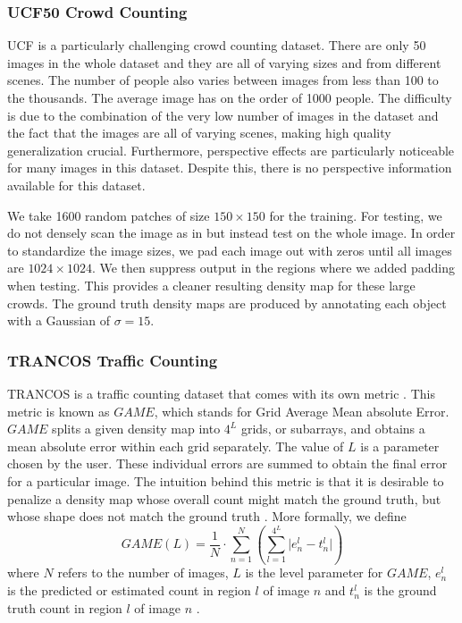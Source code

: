 \documentclass[10pt,twocolumn,letterpaper]{article}
\begin{document}
\subsubsection{UCF50 Crowd Counting}

UCF is a particularly challenging crowd counting dataset. There are only 50 images in the whole dataset and they are all of varying sizes and from different scenes. The number of people also varies between images from less than 100 to the thousands. The average image has on the order of 1000 people. The difficulty is due to the combination of the very low number of images in the dataset and the fact that the images are all of varying scenes, making high quality generalization crucial. Furthermore, perspective effects are particularly noticeable for many images in this dataset. Despite this, there is no perspective information available for this dataset.

We take 1600 random patches of size \(150 \times 150\) for the training. For testing, we do not densely scan the image as in \cite{rubio2016} but instead test on the whole image. In order to standardize the image sizes, we pad each image out with zeros until all images are \(1024 \times 1024\). We then suppress output in the regions where we added padding when testing. This provides a cleaner resulting density map for these large crowds. The ground truth density maps are produced by annotating each object with a Gaussian of \(\sigma = 15\).

\subsubsection{TRANCOS Traffic Counting}\label{trancos_explanation}

TRANCOS is a traffic counting dataset that comes with its own metric \cite{TRANCOSdataset_IbPRIA2015}. This metric is known as \(GAME\), which stands for Grid Average Mean absolute Error. \(GAME\) splits a given density map into \(4^L\) grids, or subarrays, and obtains a mean absolute error within each grid separately. The value of \(L\) is a parameter chosen by the user. These individual errors are summed to obtain the final error for a particular image. The intuition behind this metric is that it is desirable to penalize a density map whose overall count might match the ground truth, but whose shape does not match the ground truth \cite{TRANCOSdataset_IbPRIA2015}. More formally, we define
\begin{equation}
GAME(L) = \frac{1}{N} \cdot \sum_{n = 1}^{N} \left( \sum_{l = 1}^{4^L}\lvert e_n^l - t_n^l \rvert \right)
\end{equation}
where \(N\) refers to the number of images, \(L\) is the level parameter for \(GAME\), \(e_n^l\) is the predicted or estimated count in region \(l\) of image \(n\) and \(t_n^l\) is the ground truth count in region \(l\) of image \(n\) \cite{TRANCOSdataset_IbPRIA2015}.
\end{document}
